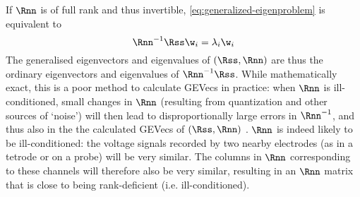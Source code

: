 If $\Rnn$ is of full rank and thus invertible, \cref{eq:generalized-eigenproblem} is equivalent to
\[
\Rnn^{-1} \Rss \w_i = \lambda_i \w_i
\]
The generalised eigenvectors and eigenvalues of $(\Rss, \Rnn)$ are thus the ordinary eigenvectors and eigenvalues of $\Rnn^{-1} \Rss$. While mathematically exact, this is a poor method to calculate GEVecs in practice: when $\Rnn$ is ill-conditioned, small changes in $\Rnn$ (resulting from quantization and other sources of `noise') will then lead to disproportionally large errors in $\Rnn^{-1}$, and thus also in the the calculated GEVecs of $(\Rss, \Rnn)$ \cite{Trefethen1997,Golub2013}. $\Rnn$ is indeed likely to be ill-conditioned: the voltage signals recorded by two nearby electrodes (as in a tetrode or on a probe) will be very similar. The columns in $\Rnn$ corresponding to these channels will therefore also be very similar, resulting in an $\Rnn$ matrix that is close to being rank-deficient (i.e. ill-conditioned).
